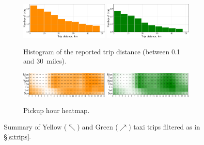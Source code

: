 \documentclass[12pt,notitlepage]{article}
\begin{document}
\begin{figure}[!p]
    \begin{subfigure}{\linewidth}
		\includegraphics[width=0.49\textwidth]{20210610-NYCTLC/e_explore/trip_distance_histogram/yellow_tripdata_2016-05}
		\hfill
		\includegraphics[width=0.49\textwidth]{20210610-NYCTLC/e_explore/trip_distance_histogram/green_tripdata_2016-05}
	
		\caption{Histogram of the reported trip distance (between 0.1 and \SI{30}{miles}). }
		\label{f:nyctlc-disthist}
	\end{subfigure}
	
	\vspace{\baselineskip}
	
    \begin{subfigure}{\linewidth}
		\includegraphics[width=0.49\textwidth]{20210610-NYCTLC/e_explore/pickup_hour_heatmap/yellow_tripdata_2016-05}
		\hfill
		\includegraphics[width=0.49\textwidth]{20210610-NYCTLC/e_explore/pickup_hour_heatmap/green_tripdata_2016-05}
		
		\caption{Pickup hour heatmap.}
		\label{f:nyctlc-pickup}
	\end{subfigure}
	
		
	\vspace{0.25\baselineskip}%
	\vspace{-0.25\baselineskip}
	
	\caption{%
		Summary 
		of 
		Yellow ($\nwarrow$) and Green ($\nearrow$) taxi trips 
		filtered as in \S\ref{s:trips}.
	}
	\label{f:nyctlc}
\end{figure}
\end{document}
